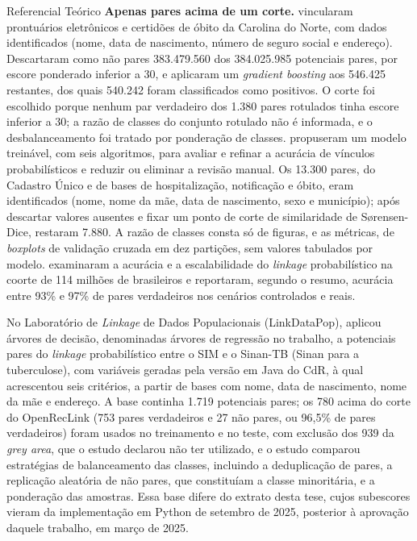 \begin{chapter}{Referencial Teórico}
\textbf{Apenas pares acima de um corte.}  vincularam prontuários eletrônicos e certidões de óbito da Carolina do Norte, com dados identificados (nome, data de nascimento, número de seguro social e endereço). Descartaram como não pares 383.479.560 dos 384.025.985 potenciais pares, por escore ponderado inferior a 30, e aplicaram um \textit{gradient boosting} aos 546.425 restantes, dos quais 540.242 foram classificados como positivos. O corte foi escolhido porque nenhum par verdadeiro dos 1.380 pares rotulados tinha escore inferior a 30; a razão de classes do conjunto rotulado não é informada, e o desbalanceamento foi tratado por ponderação de classes.  propuseram um modelo treinável, com seis algoritmos, para avaliar e refinar a acurácia de vínculos probabilísticos e reduzir ou eliminar a revisão manual. Os 13.300 pares, do Cadastro Único e de bases de hospitalização, notificação e óbito, eram identificados (nome, nome da mãe, data de nascimento, sexo e município); após descartar valores ausentes e fixar um ponto de corte de similaridade de S{\o}rensen-Dice, restaram 7.880. A razão de classes consta só de figuras, e as métricas, de \textit{boxplots} de validação cruzada em dez partições, sem valores tabulados por modelo.  examinaram a acurácia e a escalabilidade do \textit{linkage} probabilístico na coorte de 114 milhões de brasileiros e reportaram, segundo o resumo, acurácia entre 93\% e 97\% de pares verdadeiros nos cenários controlados e reais.

No Laboratório de \textit{Linkage} de Dados Populacionais (LinkDataPop),  aplicou árvores de decisão, denominadas árvores de regressão no trabalho, a potenciais pares do \textit{linkage} probabilístico entre o SIM e o Sinan-TB (Sinan para a tuberculose), com variáveis geradas pela versão em Java do CdR, à qual acrescentou seis critérios, a partir de bases com nome, data de nascimento, nome da mãe e endereço. A base continha 1.719 potenciais pares; os 780 acima do corte do OpenRecLink (753 pares verdadeiros e 27 não pares, ou 96,5\% de pares verdadeiros) foram usados no treinamento e no teste, com exclusão dos 939 da \textit{grey area}, que o estudo declarou não ter utilizado, e o estudo comparou estratégias de balanceamento das classes, incluindo a deduplicação de pares, a replicação aleatória de não pares, que constituíam a classe minoritária, e a ponderação das amostras. Essa base difere do extrato desta tese, cujos subescores vieram da implementação em Python de setembro de 2025, posterior à aprovação daquele trabalho, em março de 2025.


\end{chapter}

